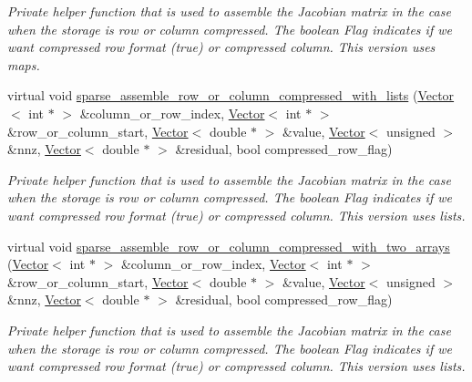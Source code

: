\begin{DoxyCompactItemize}
\begin{DoxyCompactList}\small\item\em Private helper function that is used to assemble the Jacobian matrix in the case when the storage is row or column compressed. The boolean Flag indicates if we want compressed row format (true) or compressed column. This version uses maps. \end{DoxyCompactList}\item 
virtual void \hyperlink{classoomph_1_1Problem_a18867724e4682e69f10fe19d7a20116d}{sparse\+\_\+assemble\+\_\+row\+\_\+or\+\_\+column\+\_\+compressed\+\_\+with\+\_\+lists} (\hyperlink{classoomph_1_1Vector}{Vector}$<$ int $\ast$ $>$ \&column\+\_\+or\+\_\+row\+\_\+index, \hyperlink{classoomph_1_1Vector}{Vector}$<$ int $\ast$ $>$ \&row\+\_\+or\+\_\+column\+\_\+start, \hyperlink{classoomph_1_1Vector}{Vector}$<$ double $\ast$ $>$ \&value, \hyperlink{classoomph_1_1Vector}{Vector}$<$ unsigned $>$ \&nnz, \hyperlink{classoomph_1_1Vector}{Vector}$<$ double $\ast$ $>$ \&residual, bool compressed\+\_\+row\+\_\+flag)
\begin{DoxyCompactList}\small\item\em Private helper function that is used to assemble the Jacobian matrix in the case when the storage is row or column compressed. The boolean Flag indicates if we want compressed row format (true) or compressed column. This version uses lists. \end{DoxyCompactList}\item 
virtual void \hyperlink{classoomph_1_1Problem_a19520f8a38dc1dabb33cd7f397ff3506}{sparse\+\_\+assemble\+\_\+row\+\_\+or\+\_\+column\+\_\+compressed\+\_\+with\+\_\+two\+\_\+arrays} (\hyperlink{classoomph_1_1Vector}{Vector}$<$ int $\ast$ $>$ \&column\+\_\+or\+\_\+row\+\_\+index, \hyperlink{classoomph_1_1Vector}{Vector}$<$ int $\ast$ $>$ \&row\+\_\+or\+\_\+column\+\_\+start, \hyperlink{classoomph_1_1Vector}{Vector}$<$ double $\ast$ $>$ \&value, \hyperlink{classoomph_1_1Vector}{Vector}$<$ unsigned $>$ \&nnz, \hyperlink{classoomph_1_1Vector}{Vector}$<$ double $\ast$ $>$ \&residual, bool compressed\+\_\+row\+\_\+flag)
\begin{DoxyCompactList}\small\item\em Private helper function that is used to assemble the Jacobian matrix in the case when the storage is row or column compressed. The boolean Flag indicates if we want compressed row format (true) or compressed column. This version uses lists. \end{DoxyCompactList}\item 

\end{DoxyCompactItemize}

